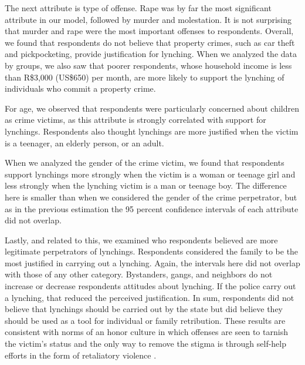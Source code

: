 \documentclass[12pt,a4paper]{article}
\begin{document}
The next attribute is type of offense. Rape was by far the most significant
attribute in our model, followed by murder and molestation. It is not
surprising that murder and rape were the most important offenses to
respondents. Overall, we found that respondents do not believe that property
crimes, such as car theft and pickpocketing, provide justification for
lynching. When we analyzed the data by groups, we also saw that poorer
respondents, whose household income is less than R\$3,000 (US\$650) per month,
are more likely to support the lynching of individuals who commit a property
crime. 

For age, we observed that respondents were particularly concerned about
children as crime victims, as this attribute is strongly correlated with
support for lynchings. Respondents also thought lynchings are more justified
when the victim is a teenager, an elderly person, or an adult.

When we analyzed the gender of the crime victim, we found that respondents
support lynchings more strongly when the victim is a woman or teenage girl and
less strongly when the lynching victim is a man or teenage boy. The difference
here is smaller than when we considered the gender of the crime perpetrator,
but as in the previous estimation the 95 percent confidence intervals of each
attribute did not overlap. 

Lastly, and related to this, we examined who respondents believed are more
legitimate perpetrators of lynchings. Respondents considered the family to be
the most justified in carrying out a lynching. Again, the intervals here did
not overlap with those of any other category. Bystanders, gangs, and neighbors
do not increase or decrease respondents attitudes about lynching. If the police
carry out a lynching, that reduced the perceived justification. In sum,
respondents did not believe that lynchings should be carried out by the state
but did believe they should be used as a tool for individual or family
retribution. These results are consistent with norms of an honor culture in
which offenses are seen to tarnish the victim's status and the only way to
remove the stigma is through self-help efforts in the form of retaliatory
violence \citep{nisbett2018culture}.
\end{document}
